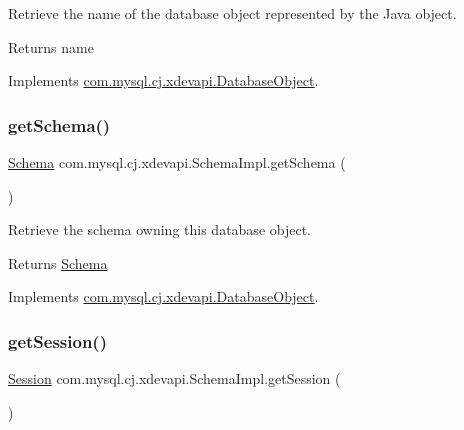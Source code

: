 Retrieve the name of the database object represented by the Java object.

\begin{DoxyReturn}{Returns}
name 
\end{DoxyReturn}


Implements \mbox{\hyperlink{interfacecom_1_1mysql_1_1cj_1_1xdevapi_1_1_database_object_a482b3ae6f40ec6332bb7d8d8d02d1dda}{com.\+mysql.\+cj.\+xdevapi.\+Database\+Object}}.

\mbox{\label{classcom_1_1mysql_1_1cj_1_1xdevapi_1_1_schema_impl_aed68ad42cc9c13041185849537c8b791}} 
\subsubsection{\texorpdfstring{get\+Schema()}{getSchema()}}
{\footnotesize\ttfamily \mbox{\hyperlink{interfacecom_1_1mysql_1_1cj_1_1xdevapi_1_1_schema}{Schema}} com.\+mysql.\+cj.\+xdevapi.\+Schema\+Impl.\+get\+Schema (\begin{DoxyParamCaption}{ }\end{DoxyParamCaption})}

Retrieve the schema owning this database object.

\begin{DoxyReturn}{Returns}
\mbox{\hyperlink{interfacecom_1_1mysql_1_1cj_1_1xdevapi_1_1_schema}{Schema}} 
\end{DoxyReturn}


Implements \mbox{\hyperlink{interfacecom_1_1mysql_1_1cj_1_1xdevapi_1_1_database_object_a2d3d1b87950c42ecbe557248c51c954b}{com.\+mysql.\+cj.\+xdevapi.\+Database\+Object}}.

\mbox{\label{classcom_1_1mysql_1_1cj_1_1xdevapi_1_1_schema_impl_ab09abc096390ec7f763d045636551b7f}} 
\subsubsection{\texorpdfstring{get\+Session()}{getSession()}}
{\footnotesize\ttfamily \mbox{\hyperlink{interfacecom_1_1mysql_1_1cj_1_1xdevapi_1_1_session}{Session}} com.\+mysql.\+cj.\+xdevapi.\+Schema\+Impl.\+get\+Session (\begin{DoxyParamCaption}{ }\end{DoxyParamCaption})}

